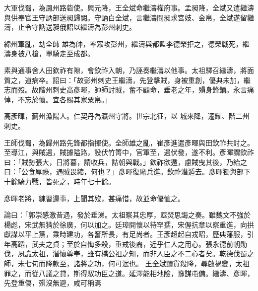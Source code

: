 \begin{pinyinscope}
 大軍伐蜀，為鳳州路砦使。興元降，王全斌命繼濤權府事。孟昶降，全斌又遣繼濤與供奉官王守訥部送昶歸闕。守訥白全斌，言繼濤問昶求宮妓、金帛，全斌遂留繼濤，止令守訥送昶俄詔以繼濤為彭州刺史。



 綿州軍亂，劫全師
 雄為帥，率眾攻彭州，繼濤與都監李德榮拒之，德榮戰死，繼濤身被八槍，單騎走至成都。



 素與通事舍人田欽祚有隙，會欽祚入朝，乃誣奏繼濤以他事。太祖驛召繼濤，將面質之，道病卒。詔曰：「故彭州刺史王繼濤，先登擊賊，身被重創，優典未加，繼志而歿。故階州刺史高彥暉，帥師討賊，奮不顧命，垂老之年，殞身鋒鏑。永言痛悼，不忘於懷。宜各賜其家粟帛。」



 高彥暉，薊州漁陽人。仁契丹為瀛州守將。世宗北征，以
 城來降，遷耀、階二州刺史。



 王師伐蜀，為歸州路先鋒都指揮使。全師雄之亂，崔彥進遣彥暉與田欽祚共討之。至導江，與賊遇，賊據隘路，設伏竹箐中，官軍至，遇伏發，遂不利。彥暉謂欽祚曰：「賊勢張大，日將暮，請收兵，詰朝與戰。」欽祚欲遁，慮賊曳其後，乃紿之曰：「公食厚祿，遇賊畏縮，何也？」彥暉復麾兵進。欽祚潛遁去。彥暉獨與部下十餘騎力戰，皆死之，時年七十餘。



 彥暉老將，練習邊事，上聞其歿，甚痛惜，故並命優恤之。



 論曰：「郭崇感激昔遇，發於垂涕。太祖察其忠厚，亟焚思誨之奏。雖魏文不強於楊彪，宋武無猜於徐廣，何以加之。廷璋開懷以待罕孺，宋偓抗章以察重進，向拱獻謀以平上黨，乘時建功，各奮所長，有足尚者。王彥超起自戎昭，歷典藩服，引年高蹈，武夫之貞；至於自悔多殺，垂戒後裔，近乎仁人之用心。張永德前朝勛伐，夙識太祖，潛懷尊奉，雖有橋公祖之知，而非人臣之不二心者矣。乾德伐蜀之師，未七旬而降款至，諸將之功，何可泯也。
 王全斌黷貨殺降，尋啟禍變，太祖罪之，而從八議之貸，斯得馭功臣之道。延澤能相地險，豫謀屯備。繼濤、彥暉，先登重傷，殞沒無避，咸可稱焉



\end{pinyinscope}